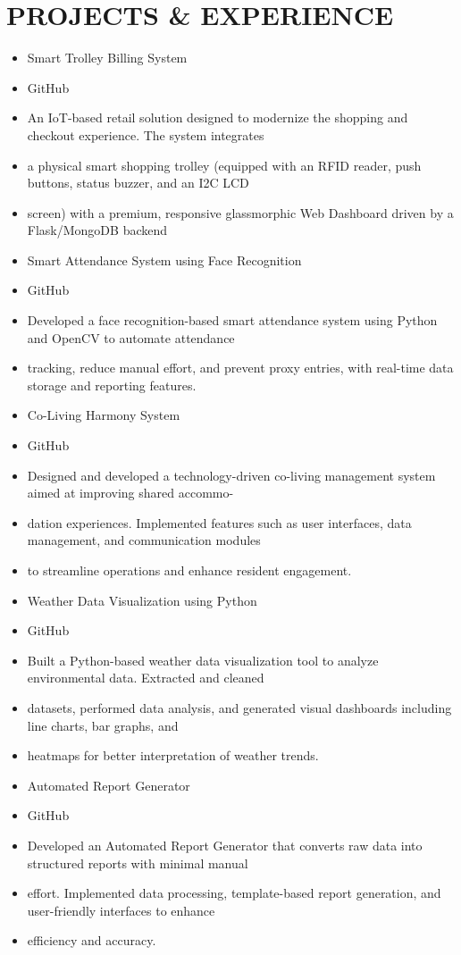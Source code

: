 \documentclass[10pt,a4paper]{article}
\begin{document}

\section*{PROJECTS \& EXPERIENCE}

\begin{itemize}[leftmargin=*]
    \item Smart Trolley Billing System
    \item GitHub
    \item An IoT-based retail solution designed to modernize the shopping and checkout experience. The system integrates
    \item a physical smart shopping trolley (equipped with an RFID reader, push buttons, status buzzer, and an I2C LCD
    \item screen) with a premium, responsive glassmorphic Web Dashboard driven by a Flask/MongoDB backend
    \item Smart Attendance System using Face Recognition
    \item GitHub
    \item Developed a face recognition-based smart attendance system using Python and OpenCV to automate attendance
    \item tracking, reduce manual effort, and prevent proxy entries, with real-time data storage and reporting features.
    \item Co-Living Harmony System
    \item GitHub
    \item Designed and developed a technology-driven co-living management system aimed at improving shared accommo-
    \item dation experiences. Implemented features such as user interfaces, data management, and communication modules
    \item to streamline operations and enhance resident engagement.
    \item Weather Data Visualization using Python
    \item GitHub
    \item Built a Python-based weather data visualization tool to analyze environmental data. Extracted and cleaned
    \item datasets, performed data analysis, and generated visual dashboards including line charts, bar graphs, and
    \item heatmaps for better interpretation of weather trends.
    \item Automated Report Generator
    \item GitHub
    \item Developed an Automated Report Generator that converts raw data into structured reports with minimal manual
    \item effort. Implemented data processing, template-based report generation, and user-friendly interfaces to enhance
    \item efficiency and accuracy.
\end{itemize}
\end{document}
